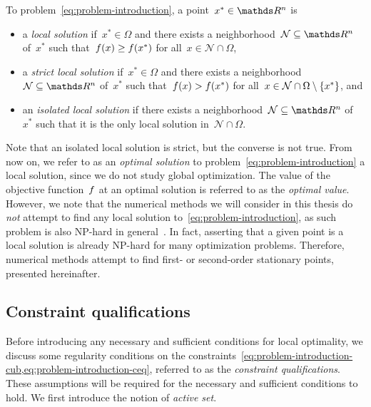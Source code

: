 \begin{definition}
    \label{def:local-solution}
    To problem~\cref{eq:problem-introduction}, a point~$x^{\ast} \in \R^n$ is
    \begin{itemize}
        \item a \emph{local solution} if~$x^{\ast} \in \Omega$ and there exists a neighborhood~$\mathcal{N} \subseteq \R^n$ of~$x^{\ast}$ such that~$f(x) \ge f(x^{\ast})$ for all~$x \in \mathcal{N} \cap \Omega$,
        \item a \emph{strict local solution} if~$x^{\ast} \in \Omega$ and there exists a neighborhood~$\mathcal{N} \subseteq \R^n$ of~$x^{\ast}$ such that~$f(x) > f(x^{\ast})$ for all~$x \in \mathcal{N} \cap \Omega \setminus \{x^{\ast}\}$, and
        \item an \emph{isolated local solution} if there exists a neighborhood~$\mathcal{N} \subseteq \R^n$ of~$x^{\ast}$ such that it is the only local solution in~$\mathcal{N} \cap \Omega$.
    \end{itemize}
\end{definition}

Note that an isolated local solution is strict, but the converse is not true.
From now on, we refer to as an \emph{optimal solution} to problem~\cref{eq:problem-introduction} a local solution, since we do not study global optimization.
The value of the objective function~$f$ at an optimal solution is referred to as the \emph{optimal value}.
However, we note that the numerical methods we will consider in this thesis do \emph{not} attempt to find any local solution to~\cref{eq:problem-introduction}, as such problem is also NP-hard in general~\cite{Murty_Kabadi_1987}.
In fact, asserting that a given point is a local solution is already NP-hard for many optimization problems.
Therefore, numerical methods attempt to find first- or second-order stationary points, presented hereinafter.

\subsection{Constraint qualifications}

Before introducing any necessary and sufficient conditions for local optimality, we discuss some regularity conditions on the constraints~\cref{eq:problem-introduction-cub,eq:problem-introduction-ceq}, referred to as the \emph{constraint qualifications}.
These assumptions will be required for the necessary and sufficient conditions to hold.
We first introduce the notion of \emph{active set}.


